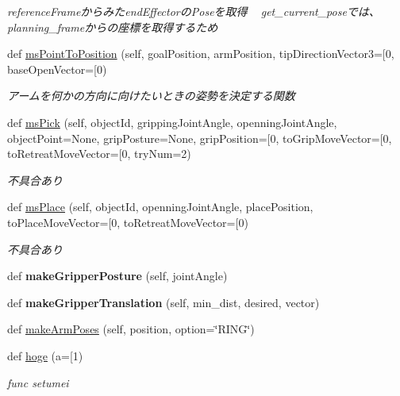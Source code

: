 \begin{DoxyCompactItemize}
\begin{DoxyCompactList}\small\item\em reference\+Frameからみたend\+Effectorの\+Poseを取得 ~\newline
 get\+\_\+current\+\_\+poseでは、planning\+\_\+frameからの座標を取得するため \end{DoxyCompactList}\item 
def \hyperlink{classmsMoveGroup_1_1msMoveGroup_a6d54897d1d6dde1a6782da893e281609}{ms\+Point\+To\+Position} (self, goal\+Position, arm\+Position, tip\+Direction\+Vector3=\mbox{[}0, base\+Open\+Vector=\mbox{[}0)
\begin{DoxyCompactList}\small\item\em アームを何かの方向に向けたいときの姿勢を決定する関数 \end{DoxyCompactList}\item 
def \hyperlink{classmsMoveGroup_1_1msMoveGroup_afbe74bb02250901bedb872f2ca6ae542}{ms\+Pick} (self, object\+Id, gripping\+Joint\+Angle, openning\+Joint\+Angle, object\+Point=None, grip\+Posture=None, grip\+Position=\mbox{[}0, to\+Grip\+Move\+Vector=\mbox{[}0, to\+Retreat\+Move\+Vector=\mbox{[}0, try\+Num=2)
\begin{DoxyCompactList}\small\item\em 不具合あり \end{DoxyCompactList}\item 
def \hyperlink{classmsMoveGroup_1_1msMoveGroup_a203c6ca35199220d7aa82128fb50c28d}{ms\+Place} (self, object\+Id, openning\+Joint\+Angle, place\+Position, to\+Place\+Move\+Vector=\mbox{[}0, to\+Retreat\+Move\+Vector=\mbox{[}0)\hypertarget{classmsMoveGroup_1_1msMoveGroup_a203c6ca35199220d7aa82128fb50c28d}{}\label{classmsMoveGroup_1_1msMoveGroup_a203c6ca35199220d7aa82128fb50c28d}

\begin{DoxyCompactList}\small\item\em 不具合あり \end{DoxyCompactList}\item 
def {\bfseries make\+Gripper\+Posture} (self, joint\+Angle)\hypertarget{classmsMoveGroup_1_1msMoveGroup_a1bba0e1fe93c0a8306b8fbc52fc382e8}{}\label{classmsMoveGroup_1_1msMoveGroup_a1bba0e1fe93c0a8306b8fbc52fc382e8}

\item 
def {\bfseries make\+Gripper\+Translation} (self, min\+\_\+dist, desired, vector)\hypertarget{classmsMoveGroup_1_1msMoveGroup_ad1a287ac761df1eb05d97efd5bb6ac28}{}\label{classmsMoveGroup_1_1msMoveGroup_ad1a287ac761df1eb05d97efd5bb6ac28}

\item 
def \hyperlink{classmsMoveGroup_1_1msMoveGroup_af0b43285c3f86890835cfdb2bd68b9ee}{make\+Arm\+Poses} (self, position, option=\char`\"{}R\+I\+NG\char`\"{})
\item 
def \hyperlink{classmsMoveGroup_1_1msMoveGroup_a5faf711fd580658280b0611969a3c45d}{hoge} (a=\mbox{[}1)
\begin{DoxyCompactList}\small\item\em func setumei \end{DoxyCompactList}\end{DoxyCompactItemize}


